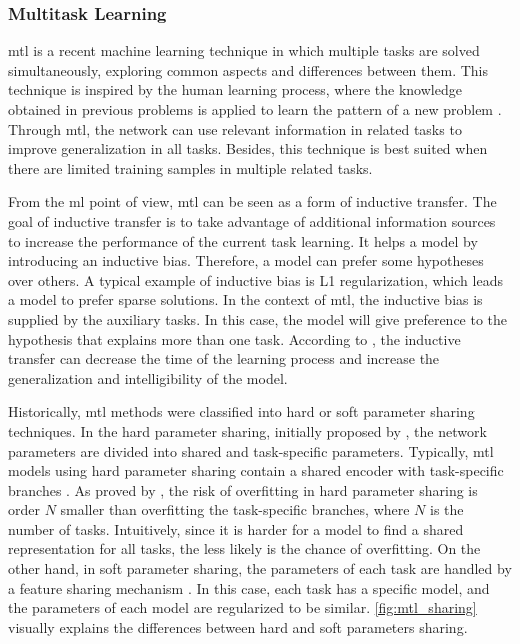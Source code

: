 \subsubsection{Multitask Learning}

\acf{mtl} is a recent machine learning technique in which multiple tasks are solved simultaneously, exploring common aspects and differences between them. This technique is inspired by the human learning process, where the knowledge obtained in previous problems is applied to learn the pattern of a new problem \citep{zhang2017survey}. Through \acs{mtl}, the network can use relevant information in related tasks to improve generalization in all tasks. Besides, this technique is best suited when there are limited training samples in multiple related tasks.

From the \acl{ml} point of view, \acl{mtl} can be seen as a form of inductive transfer. The goal of inductive transfer is to take advantage of additional information sources to increase the performance of the current task learning. It helps a model by introducing an inductive bias. Therefore, a model can prefer some hypotheses over others. A typical example of inductive bias is L1 regularization, which leads a model to prefer sparse solutions. In the context of \acs{mtl}, the inductive bias is supplied by the auxiliary tasks. In this case, the model will give preference to the hypothesis that explains more than one task. According to \cite{Caruana1997}, the inductive transfer can decrease the time of the learning process and increase the generalization and intelligibility of the model. 

Historically, \acs{mtl} methods were classified into hard or soft parameter sharing techniques. In the hard parameter sharing, initially proposed by \cite{Caruana1997}, the network parameters are divided into shared and task-specific parameters. Typically, \acs{mtl} models using hard parameter sharing contain a shared encoder with task-specific branches \citep{kendall2018multi, chen2018gradnorm, sener2018multi}. As proved by \cite{baxter1997bayesian}, the risk of overfitting in hard parameter sharing is order $N$ smaller than overfitting the task-specific branches, where $N$ is the number of tasks. Intuitively, since it is harder for a model to find a shared representation for all tasks, the less likely is the chance of overfitting. On the other hand, in soft parameter sharing, the parameters of each task are handled by a feature sharing mechanism \citep{ruder2019latent, gao2019nddr, liu2019end}. In this case, each task has a specific model, and the parameters of each model are regularized to be similar. \autoref{fig:mtl_sharing} visually explains the differences between hard and soft parameters sharing.

